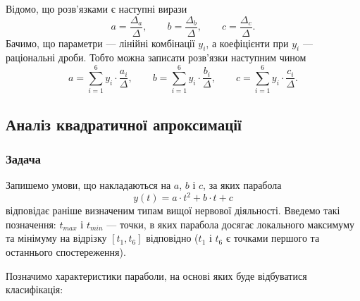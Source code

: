 Відомо, що розв’язками є наступні вирази
\begin{equation*}
  a = \frac{\Delta_a}{\Delta},\qquad
  b = \frac{\Delta_b}{\Delta},\qquad
  c = \frac{\Delta_c}{\Delta}.
\end{equation*}
Бачимо, що параметри --- лінійні комбінації $y_i$, а коефіцієнти при $y_i$ ---
раціональні дроби.
Тобто можна записати розв’язки наступним чином
\begin{equation*}
  a = \sum_{i=1}^{6} y_i \cdot \frac{a_i}{\Delta},\qquad
  b = \sum_{i=1}^{6} y_i \cdot \frac{b_i}{\Delta},\qquad
  c = \sum_{i=1}^{6} y_i \cdot \frac{c_i}{\Delta}.
\end{equation*}

\subsection{Аналіз квадратичної апроксимації}

\subsubsection{Задача}
Запишемо умови, що накладаються на $a$, $b$ і $c$, за яких парабола
\begin{equation*}
  y\left( t \right) = a \cdot t^2 + b \cdot t + c
\end{equation*}
відповідає раніше визначеним типам вищої нервової діяльності.
Введемо такі позначення: $t_{max}$ і $t_{min}$ --- точки, в яких парабола
досягає локального максимуму та мінімуму на відрізку $\left[ t_1, t_6 \right]$
відповідно ($t_1$ і $t_6$ є точками першого та останнього спостереження).

Позначимо характеристики параболи, на основі яких буде відбуватися класифікація:


